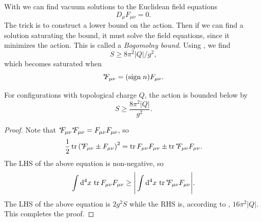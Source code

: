 With  we can find vacuum solutions to the Euclidean
field equations
\begin{equation}
  D_\mu F_{\mu\nu}=0.
\end{equation}
The trick is to construct a lower bound on the action. Then if we can
find a solution saturating the bound, it must solve the field equations,
since it minimizes the action. This is called a 
{\it Bogomolny bound}.
Using , we find
\begin{equation}\label{eq:bogo}
  S\geq 8\pi^2|Q|/g^2,
\end{equation}
which becomes saturated when
\begin{equation}\label{eq:efeq}
  {}^{*\hspace{-1mm}}{F_{\mu\nu}}=(\text{sign}\;n)F_{\mu\nu}.
\end{equation}
\begin{proposition}{}{}
For configurations with topological charge $Q$,
the action is bounded below by
$$
  S\geq\frac{8\pi^2|Q|}{g^2}.
$$
  \begin{proof}
    Note that ${}^{*\hspace{-1mm}}{F_{\mu\nu}}{}^{*\hspace{-1mm}}{F_{\mu\nu}}=F_{\mu\nu}F_{\mu\nu}$, so
    $$
      \frac{1}{2}\tr\left(\dual{F_{\mu\nu}\pm F_{\mu\nu}}\right)^2
       =\tr F_{\mu\nu}F_{\mu\nu}\pm\tr\dual{F_{\mu\nu}}F_{\mu\nu}.
    $$
    The LHS of the above equation is non-negative, so
    $$
      \int\dd^4x\,\tr F_{\mu\nu}F_{\mu\nu}\geq
      \Bigg|\int\dd^4x\,\tr\dual{F_{\mu\nu}}F_{\mu\nu}\Bigg|.
    $$
    The LHS of the above equation is $2g^2S$ while the RHS
    is, according to , $16\pi^2|Q|$.
    This completes the proof.
  \end{proof}
\end{proposition}

